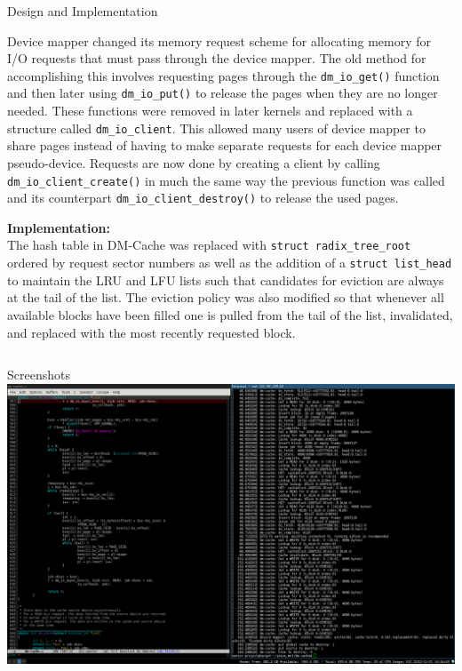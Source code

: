 \documentclass[final,12pt]{beamer}
\begin{document}
\begin{frame}{}
\begin{block}{\large Design and Implementation}
    \vspace{\baselineskip}

    Device mapper changed its memory request scheme for allocating memory for
    I/O requests that must pass through the device mapper. The old method for
    accomplishing this involves requesting pages through the
    \texttt{dm\_io\_get()} function and then later using \texttt{dm\_io\_put()}
    to release the pages when they are no longer needed. These functions were
    removed in later kernels and replaced with a structure called
    \texttt{dm\_io\_client}. This allowed many users of device mapper to share
    pages instead of having to make separate requests for each device mapper
    pseudo-device. Requests are now done by creating a client by calling
    \texttt{dm\_io\_client\_create()} in much the same way the previous function
    was called and its counterpart \texttt{dm\_io\_client\_destroy()} to release
    the used pages.

    \vspace{\baselineskip}

    \textbf{Implementation:} \\

    The hash table in DM-Cache was replaced with \texttt{struct
      radix\_tree\_root} ordered by request sector numbers as well as the
    addition of a \texttt{struct list\_head} to maintain the LRU and LFU lists
    such that candidates for eviction are always at the tail of the list. The
    eviction policy was also modified so that whenever all available blocks have
    been filled one is pulled from the tail of the list, invalidated, and
    replaced with the most recently requested block.

  \end{block}

  \begin{columns}

    \begin{column}{.5\linewidth}
      \begin{block}{\large Screenshots}
        \centering
        \includegraphics[width=.97\textwidth]{../images/screenshot.png}
      \end{block}
    \end{column}


\end{columns}
\end{frame}
\end{document}
